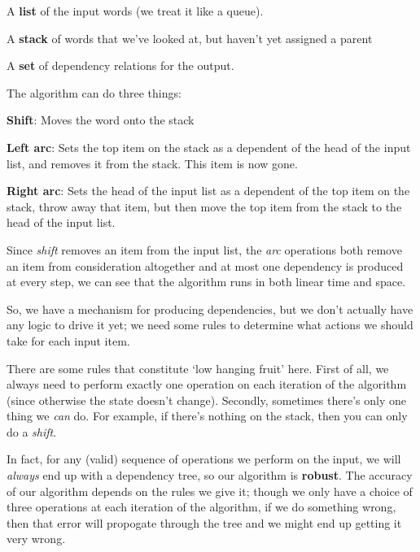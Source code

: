 \begin{description}
  \item A \textbf{list} of the input words (we treat it like a queue).
  \item A \textbf{stack} of words that we've looked at, but haven't yet assigned
    a parent
  \item A \textbf{set} of dependency relations for the output.
\end{description}

The algorithm can do three things:

\begin{description}
  \item \textbf{Shift}: Moves the word onto the stack
  \item \textbf{Left arc}: Sets the top item on the stack as a dependent of the
    head of the input list, and removes it from the stack. This item is now
    gone.
  \item \textbf{Right arc}: Sets the head of the input list as a dependent of
    the top item on the stack, throw away that item, but then move the top item
    from the stack to the head of the input list.
\end{description}

Since \textit{shift} removes an item from the input list, the \textit{arc}
operations both remove an item from consideration altogether and at most one
dependency is produced at every step, we can see that the algorithm runs in both
linear time and space.

So, we have a mechanism for producing dependencies, but we don't actually have
any logic to drive it yet; we need some rules to determine what actions we
should take for each input item.

There are some rules that constitute `low hanging fruit' here. First of all, we
always need to perform exactly one operation on each iteration of the algorithm
(since otherwise the state doesn't change). Secondly, sometimes there's only one
thing we \textit{can} do. For example, if there's nothing on the stack, then you
can only do a \textit{shift}.

In fact, for any (valid) sequence of operations we perform on the input, we will
\textit{always} end up with a dependency tree, so our algorithm is
\textbf{robust}. The accuracy of our algorithm depends on the rules we give it;
though we only have a choice of three operations at each iteration of the
algorithm, if we do something wrong, then that error will propogate through the
tree and we might end up getting it very wrong.

